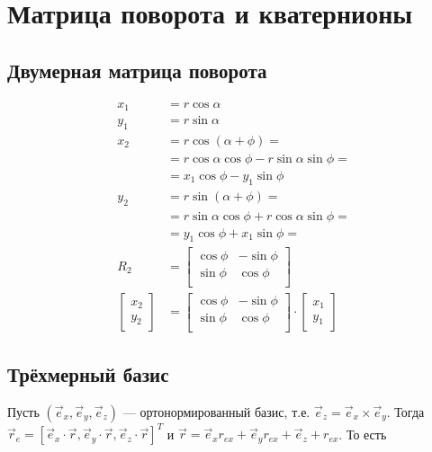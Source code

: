 \section{Матрица поворота и кватернионы}
\subsection{Двумерная матрица поворота}
\begin{align*}
    x_1 & = r \cos \alpha \\
    y_1 & = r \sin \alpha \\
    x_2
    & = r \cos (\alpha + \phi) = \\
    & = r \cos \alpha \cos \phi - r \sin \alpha \sin \phi = \\
    & = x_1 \cos \phi - y_1 \sin \phi \\
    y_2
    & = r \sin (\alpha + \phi) = \\
    & = r \sin \alpha \cos \phi + r \cos \alpha \sin \phi = \\
    & = y_1 \cos \phi + x_1 \sin \phi = \\
    R_2 & =
    \begin{bmatrix}
        \cos \phi & -\sin \phi \\
        \sin \phi & \cos \phi \\
    \end{bmatrix} \\
    \begin{bmatrix} x_2 \\ y_2 \end{bmatrix}
    & =
    \begin{bmatrix}
        \cos \phi & -\sin \phi \\
        \sin \phi & \cos \phi \\
    \end{bmatrix} \cdot
    \begin{bmatrix} x_1 \\ y_1 \end{bmatrix}
\end{align*}

\subsection{Трёхмерный базис}
Пусть $(\vec{e}_x, \vec{e}_y, \vec{e}_z)$
--- ортонормированный базис,
т.е. $\vec{e}_z = \vec{e}_x \times \vec{e}_y$.
Тогда
$\vec{r}_e = [
    \vec{e}_x \cdot \vec{r},
    \vec{e}_y \cdot \vec{r},
    \vec{e}_z \cdot \vec{r}]^T$
и
$\vec{r} = \vec{e}_x r_{ex} + \vec{e}_y r_{ex} + \vec{e}_z + r_{ex}$.
То есть

